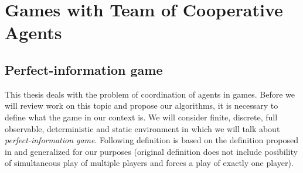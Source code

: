 \chapter{Games with Team of Cooperative Agents}
\label{chap_mas}





\section{Perfect-information game}



This thesis deals with the problem of coordination of agents in games. Before we will review
work on this topic and propose our algorithms, it is necessary to define what the game in our
context is. We will consider finite, discrete, full observable, deterministic and static
environment in which we will talk about \emph{perfect-information game}. Following definition
is based on the definition
proposed in \cite{MAS2008} and generalized for our purposes (original definition does not
include posibility of simultaneous play of multiple players and forces a play of exactly one
player).


